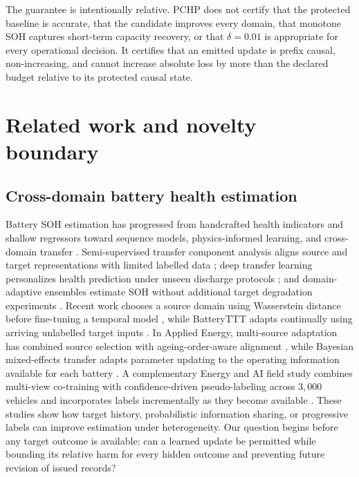 \documentclass[11pt]{article}
\begin{document}
The guarantee is intentionally relative. PCHP does not certify that the protected baseline is accurate, that the candidate improves every domain, that monotone SOH captures short-term capacity recovery, or that $\delta=0.01$ is appropriate for every operational decision. It certifies that an emitted update is prefix causal, non-increasing, and cannot increase absolute loss by more than the declared budget relative to its protected causal state.

\section{Related work and novelty boundary}

\subsection{Cross-domain battery health estimation}

Battery SOH estimation has progressed from handcrafted health indicators and shallow regressors toward sequence models, physics-informed learning, and cross-domain transfer \citep{ng2020mlbattery,roman2021pipeline,wang2024pinn}. Semi-supervised transfer component analysis aligns source and target representations with limited labelled data \citep{li2020sstca}; deep transfer learning personalizes health prediction under unseen discharge protocols \citep{ma2022personalized}; and domain-adaptive ensembles estimate SOH without additional target degradation experiments \citep{lu2023without}. Recent work chooses a source domain using Wasserstein distance before fine-tuning a temporal model \citep{duan2025wasserstein}, while BatteryTTT adapts continually using arriving unlabelled target inputs \citep{feng2024batteryttt}. In Applied Energy, multi-source adaptation has combined source selection with ageing-order-aware alignment \citep{qiu2024multisource}, while Bayesian mixed-effects transfer adapts parameter updating to the operating information available for each battery \citep{zhang2025bayesian}. A complementary Energy and AI field study combines multi-view co-training with confidence-driven pseudo-labeling across $3{,}000$ vehicles and incorporates labels incrementally as they become available \citep{hadzalic2025field}. These studies show how target history, probabilistic information sharing, or progressive labels can improve estimation under heterogeneity. Our question begins before any target outcome is available: can a learned update be permitted while bounding its relative harm for every hidden outcome and preventing future revision of issued records?
\end{document}
